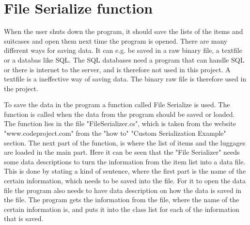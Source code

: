 \section{File Serialize function}
When the user shuts down the program, it should save the lists of the items and suitcases and open them next time the program is opened. There are many different ways for saving data. It can e.g. be saved in a raw binary file, a textfile or a databas like SQL.
The SQL databases need a program that can handle SQL or there is internet to the server, and is therefore not used in this project. A textfile is a ineffective way of saving data. The binary raw file is therefore used in the project.

To save the data in the program a function called File Serialize is used. The function is called when the data from the program should be saved or loaded. The function lies in the file "FileSerializer.cs", which is taken from the website "www.codeproject.com" from the "how to" "Custom Serialization Example" section. The next part of the function, is where the list of items and the luggages are loaded in the main part. 
Here it can be seen that the "File Serializer" needs some data descriptions to turn the information from the item list into a data file. 
This is done by stating a kind of sentence, where the first part is the name of the certain information, which needs to be saved into the file. 
For it to open the data file the program also needs to have data description on how the data is saved in the file. The program gets the information from the file, where the name of the certain information is, and puts it into the class list for each of the information that is saved.